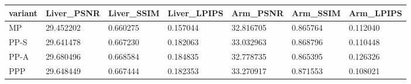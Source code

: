 \begin{tabular}{lllllll}
variant & Liver\_PSNR & Liver\_SSIM & Liver\_LPIPS & Arm\_PSNR & Arm\_SSIM & Arm\_LPIPS \\
\hline
MP & 29.452202 & 0.660275 & 0.157044 & 32.816705 & 0.865764 & 0.112040 \\
PP-S & 29.641478 & 0.667230 & 0.182063 & 33.032963 & 0.868796 & 0.110448 \\
PP-A & 29.680496 & 0.668584 & 0.184835 & 32.778735 & 0.865395 & 0.126326 \\
PPP & 29.648449 & 0.667444 & 0.182353 & 33.270917 & 0.871553 & 0.108021 \\
\end{tabular}
